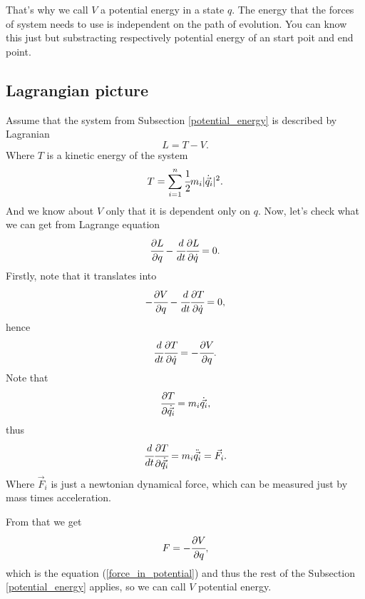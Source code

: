 \documentclass[main.tex]{subfiles}
\begin{document}
That's why we call $V$ a potential energy in a state $q$. The energy that the forces of system needs to use is independent on the path of evolution. You can know this just but substracting respectively potential energy of an start poit and end point.

\subsection{Lagrangian picture}
\label{lagrange-picture}
Assume that the system from Subsection \ref{potential_energy} is described by Lagranian 
\begin{equation}
\label{lagrange_kinetic_assumption}
L = T - V.
\end{equation}
Where $T$ is a kinetic energy of the system
\begin{equation}
T = \sum_{i=1}^n \cfrac{1}{2}m_i|\dot{\vec{q}}_i|^2.
\end{equation}
And we know about $V$ only that it is dependent only on $q$.
Now, let's check what we can get from Lagrange equation
\begin{equation}
\label{lagrange_equation2}
\cfrac{\partial L}{\partial q} - \cfrac{d}{dt}\cfrac{\partial L}{\partial \dot{q}} = 0.
\end{equation}
Firstly, note that it translates into
\begin{equation}
-\cfrac{\partial V}{\partial q} - \cfrac{d}{dt}\cfrac{\partial T}{\partial \dot{q}} = 0,
\end{equation}
hence 
\begin{equation}
\cfrac{d}{dt}\cfrac{\partial T}{\partial \dot{q}} = -\cfrac{\partial V}{\partial q}.
\end{equation}
Note that
\begin{equation}
\cfrac{\partial T}{\partial \dot{\vec{q_i}}} = m_i\dot{\vec{q_i}},
\end{equation}
thus
\begin{equation}
\cfrac{d}{dt}\cfrac{\partial T}{\partial \dot{\vec{q_i}}} = m_i\ddot{\vec{q_i}} = \vec{F}_i.
\end{equation} 
Where  $\vec{F}_i$ is just a newtonian dynamical force, which can be measured just by mass times acceleration.

From that we get
\begin{equation}
F = -\cfrac{\partial V}{\partial q},
\end{equation}
which is the equation (\ref{force_in_potential}) and thus the rest of the Subsection \ref{potential_energy} applies, so we can call $V$ potential energy.
\end{document}
